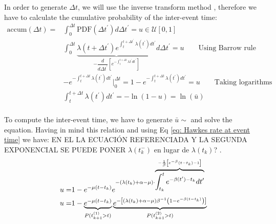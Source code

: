 In order to generate $\Delta t$, we will use the inverse transform method \cite{Toral}, therefore we have to calculate the cumulative probability of the inter-event time:
\begin{equation}
    \begin{split}
        \text{accum}(\Delta t)=&\int_{0}^{\Delta t}\text{PDF}\left( \Delta t^\prime \right)d\Delta t^\prime = u\in\mathcal{U}  [0,1]\\
        &\int_{0}^{\Delta t} \underbrace{\lambda(t+\Delta t^\prime)e^{\int_{t}^{t+\Delta t^\prime}\lambda(t^{\prime})dt^{\prime}}}_{-\dfrac{d}{d\Delta t^{\prime}}\left[ e^{-\int_{t}^{t+\Delta t}\lambda t^\prime dt^\prime} \right]}d\Delta t^\prime=u \qquad \text{Using Barrow rule}\\
        &-e^{-\int_{t}^{t+\Delta t}\lambda(t^\prime)dt^\prime}\Big|_{0}^{\Delta t}=1-e^{-\int_{t}^{t+\Delta t}\lambda(t^\prime)dt^\prime}=u\qquad \text{Taking logarithms}\\
        &\int_{t}^{t+\Delta t}\lambda(t^\prime)dt^\prime=-\ln(1-u) = \ln (\bar{u})\\
    \end{split}
    \label{eq: cumulative probability}
\end{equation}

To compute the inter-event time, we have to generate $\bar{u}\sim$ and solve the equation. Having in mind this relation and using Eq \ref{eq: Hawkes rate at event time} we have:
EN EL LA ECUACIÓN REFERENCIADA Y LA SEGUNDA EXPONENCIAL SE PUEDE PONER $\lambda(t_k^-)$ en lugar de $\lambda(t_k)$? .
\begin{equation}
    \begin{split}
        u=&1-e^{-\mu(t-t_k)}e^{-(\lambda(t_k)+\alpha-\mu)\cdot\overbrace{\int_{t_k}^{t}e^{-\beta(t^\prime)-t_k}dt^\prime}^{-\frac{1}{\beta}\left[ e^{-\beta}(t-t_k)-1 \right]}}\\
        u=&1-\underbrace{e^{-\mu(t-t_k)}}_{P(t_{k+1}^{(1)}>t)}\underbrace{e^{-\left[ (\lambda(t_k)+\alpha-\mu)\beta^{-1}\left( 1-e^{-\beta(t-t_k)} \right) \right]}}_{{P(t_{k+1}^{(2)}>t)}}
    \end{split}
    \label{eq: u = 1 - P(t_{k+1} > t)P(t_{k+1} > t), previo al composition method}
\end{equation}

